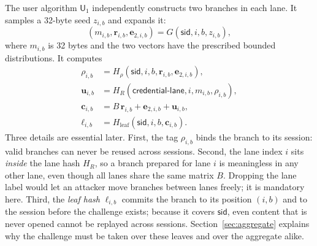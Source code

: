 \documentclass[11pt]{article}
\newcommand{\U}{\mathsf{U}}
\begin{document}
The user algorithm $\U_1$ independently constructs two branches in each lane.
It samples a
32-byte seed $z_{i,b}$ and expands it:
\[
 (m_{i,b},\mathbf r_{i,b},\mathbf e_{2,i,b})
 =G(\mathsf{sid},i,b,z_{i,b}),
\]
where $m_{i,b}$ is 32 bytes and the two vectors have the prescribed bounded
distributions.  It computes
\begin{align*}
 \rho_{i,b}&=H_\rho(\mathsf{sid},i,b,
                     \mathbf r_{i,b},\mathbf e_{2,i,b}),\\
 \mathbf u_{i,b}&=H_R(\mathsf{credential\mbox{-}lane},i,m_{i,b},\rho_{i,b}),\\
 \mathbf c_{i,b}&=B\,\mathbf r_{i,b}+\mathbf e_{2,i,b}+\mathbf u_{i,b},\\
 \ell_{i,b}&=H_{\mathrm{leaf}}(\mathsf{sid},i,b,\mathbf c_{i,b}).
\end{align*}
Three details are essential later.  First, the tag $\rho_{i,b}$ binds the
branch to its session: valid branches can never be reused across sessions.
Second, the lane index $i$ sits \emph{inside} the lane hash $H_R$, so a branch
prepared for lane $i$ is meaningless in any other lane, even though all lanes
share the same matrix $B$.  Dropping the lane label would let an attacker move
branches between lanes freely; it is mandatory here.  Third, the \emph{leaf
hash} $\ell_{i,b}$ commits the branch to its position $(i,b)$ and to the
session before the challenge exists; because it covers $\mathsf{sid}$, even
content that is never opened cannot be replayed across sessions.
Section~\ref{sec:aggregate} explains why the challenge must be taken over
these leaves and over the aggregate alike.
\end{document}
